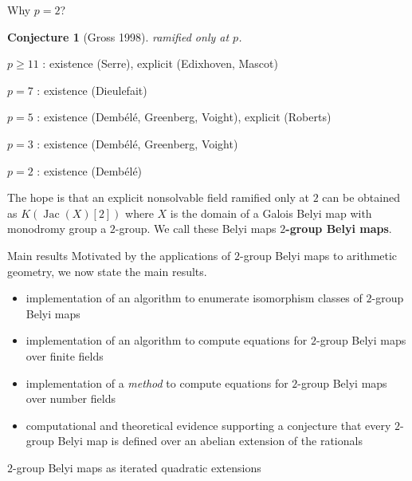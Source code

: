 \documentclass[xcolor=dvipsnames]{beamer}
\theoremstyle{plain}
\newtheorem*{conj}{Conjecture}
\newcommand{\PP}{\mathbb P}
\DeclareMathOperator{\Jac}{Jac}
\begin{document}
{\begin{frame}{Why $p=2$?}
\begin{conj}[Gross 1998]
        ramified only at $p$.
      \end{conj}
      \pause
      $p\geq 11$ : existence (Serre), explicit (Edixhoven, Mascot)
      \par
      $p=7$ : existence (Dieulefait)
      \par
      $p=5$ : existence (Demb\'{e}l\'{e}, Greenberg, Voight), explicit (Roberts)
      \par
      $p=3$ : existence (Demb\'{e}l\'{e}, Greenberg, Voight)
      \par
      $p=2$ : existence (Demb\'{e}l\'{e})
      \pause
      \par
      The hope is that an explicit nonsolvable field ramified only at $2$
      can be obtained as $K(\Jac(X)[2])$ where
      $X$ is the domain of a Galois Belyi map
      with monodromy group a $2$-group.
      \pause\newline
      We call these Belyi maps
      \textbf{$2$-group Belyi maps}.
    \end{frame}
    \begin{frame}{Main results}
      Motivated by the applications of
      $2$-group Belyi maps to arithmetic geometry,
      we now state the main results.
      \pause
      \begin{itemize}
        \item
          implementation of an algorithm to
          enumerate isomorphism classes
          of $2$-group Belyi maps
          \pause
        \item
          implementation of an algorithm to
          compute equations for
          $2$-group Belyi maps
          over finite fields
          \pause
        \item
          implementation of a \emph{method}
          to compute equations for
          $2$-group Belyi maps
          over number fields
          \pause
        \item
          computational and theoretical evidence
          supporting a conjecture that
          every $2$-group Belyi map
          is defined over an
          abelian extension of the rationals
      \end{itemize}
    \end{frame}
    \begin{frame}[fragile]{$2$-group Belyi maps as iterated quadratic extensions}
      \begin{center}
\end{center}
\end{frame}}
\end{document}
